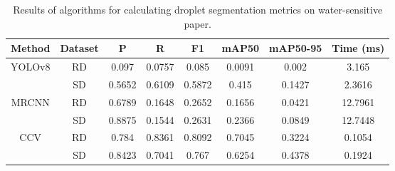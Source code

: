 
\begin{table}[h!]
    \centering
    \caption{Results of algorithms for calculating droplet segmentation metrics on water-sensitive paper.}
    \label{tab:segmentation-metrics-drop}
    \begin{tabular}{cccccccc }
        \hline
        \textbf{Method} & \textbf{Dataset} & \textbf{P} & \textbf{R} & \textbf{F1} & \textbf{mAP50} & \textbf{mAP50-95} & \textbf{Time (ms)}\\
        \hline
        \multirow{2}{2cm}[0em]{YOLOv8} & RD & 0.097 & 0.0757 & 0.085 & 0.0091 & 0.002 & 3.165\\
         & SD & 0.5652 & 0.6109 & 0.5872 & 0.415 & 0.1427 & 2.3616 \\
        
        \multirow{2}{2cm}[0em]{MRCNN} & RD & 0.6789 & 0.1648 & 0.2652 & 0.1656 & 0.0421 & 12.7961\\
         & SD & 0.8875 & 0.1544 & 0.2631 & 0.2366 & 0.0849 & 12.7448\\
       
        \multirow{2}{2cm}[0em]{CCV} & RD & 0.784 & 0.8361 & 0.8092 & 0.7045 & 0.3224 & 0.1054\\
         & SD & 0.8423 & 0.7041 & 0.767 & 0.6254 & 0.4378 & 0.1924\\
        \hline
    \end{tabular}
\end{table}
